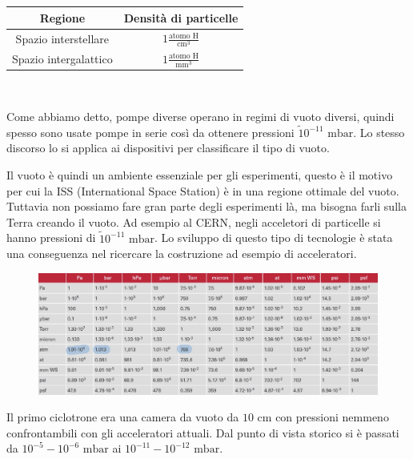 \begin{center}
    \begin{tabular}{cc}
        \toprule
        Regione & Densità di particelle \\
        \midrule
        Spazio interstellare & $1 \frac{\text{atomo H}}{\text{cm}^3}$\\
        Spazio intergalattico & $ 1\frac{\text{atomo H}}{\text{mm}^3}$\\
        \bottomrule
    \end{tabular}\\
\end{center}

Come abbiamo detto, pompe diverse operano in regimi di vuoto diversi, quindi spesso sono usate pompe in serie così da ottenere pressioni $\tilde 10^{-11} \text{ mbar}$. Lo stesso discorso lo si applica ai dispositivi per classificare il tipo di vuoto.

Il vuoto è quindi un ambiente essenziale per gli esperimenti, questo è il motivo per cui la ISS (International Space Station) è in una regione ottimale del vuoto. Tuttavia non possiamo fare gran parte degli esperimenti là, ma bisogna farli sulla Terra creando il vuoto. Ad esempio al CERN, negli acceletori di particelle si hanno pressioni di $\tilde 10^{-11} \text{ mbar}$. Lo sviluppo di questo tipo di tecnologie è stata una conseguenza nel ricercare la costruzione ad esempio di acceleratori.

\begin{figure}[!ht]
    \centering
    \includegraphics[scale=0.45]{images/pressuretablet.png}
\end{figure}

Il primo ciclotrone era una camera da vuoto da $10 \text{ cm}$ con pressioni nemmeno confrontambili con gli acceleratori attuali. Dal punto di vista storico si è passati da $10^{-5}-10^{-6} \text{ mbar}$ ai $10^{-11}-10^{-12} \text{ mbar}$.

